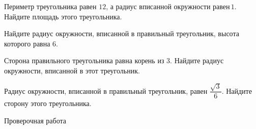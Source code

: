 \begin{class}[number=7]
\begin{listofex}
		\item Периметр треугольника равен \(12\), а радиус вписанной окружности равен \(1\). Найдите площадь этого треугольника.
		\item Найдите радиус окружности, вписанной в правильный треугольник, высота которого равна \(6\).
		\item Сторона правильного треугольника равна  корень из 3. Найдите радиус окружности, вписанной в этот треугольник.
		\item Радиус окружности, вписанной в правильный треугольник, равен \(\dfrac{\sqrt{3}}{6}\).  Найдите сторону этого треугольника.
	\end{listofex}
\end{class}

\begin{exam}
	\begin{listofex}
		\item Проверочная работа
	\end{listofex}
\end{exam}
